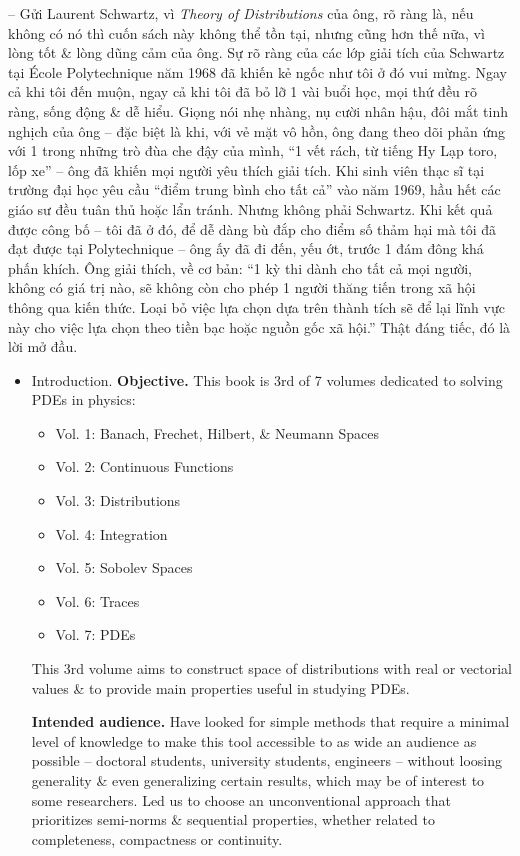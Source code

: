 \documentclass{article}
\begin{document}
\begin{enumerate}
	-- Gửi {\sc Laurent Schwartz}, vì {\it Theory of Distributions} của ông, rõ ràng là, nếu không có nó thì cuốn sách này không thể tồn tại, nhưng cũng hơn thế nữa, vì lòng tốt \& lòng dũng cảm của ông. Sự rõ ràng của các lớp giải tích của {\sc Schwartz} tại \'Ecole Polytechnique năm 1968 đã khiến kẻ ngốc như tôi ở đó vui mừng. Ngay cả khi tôi đến muộn, ngay cả khi tôi đã bỏ lỡ 1 vài buổi học, mọi thứ đều rõ ràng, sống động \& dễ hiểu. Giọng nói nhẹ nhàng, nụ cười nhân hậu, đôi mắt tinh nghịch của ông -- đặc biệt là khi, với vẻ mặt vô hồn, ông đang theo dõi phản ứng với 1 trong những trò đùa che đậy của mình, ``1 vết rách, từ tiếng Hy Lạp toro, lốp xe'' -- ông đã khiến mọi người yêu thích giải tích. Khi sinh viên thạc sĩ tại trường đại học yêu cầu ``điểm trung bình cho tất cả'' vào năm 1969, hầu hết các giáo sư đều tuân thủ hoặc lẩn tránh. Nhưng không phải {\sc Schwartz}. Khi kết quả được công bố -- tôi đã ở đó, để dễ dàng bù đắp cho điểm số thảm hại mà tôi đã đạt được tại Polytechnique -- ông ấy đã đi đến, yếu ớt, trước 1 đám đông khá phấn khích. Ông giải thích, về cơ bản: ``1 kỳ thi dành cho tất cả mọi người, không có giá trị nào, sẽ không còn cho phép 1 người thăng tiến trong xã hội thông qua kiến thức. Loại bỏ việc lựa chọn dựa trên thành tích sẽ để lại lĩnh vực này cho việc lựa chọn theo tiền bạc hoặc nguồn gốc xã hội.'' Thật đáng tiếc, đó là lời mở đầu.
	\begin{itemize}
		\item {\sf Introduction.} {\bf Objective.} This book is 3rd of 7 volumes dedicated to solving PDEs in physics:
		\begin{itemize}
			\item Vol. 1: Banach, Frechet, Hilbert, \& Neumann Spaces
			\item Vol. 2: Continuous Functions
			\item Vol. 3: Distributions
			\item Vol. 4: Integration
			\item Vol. 5: Sobolev Spaces
			\item Vol. 6: Traces
			\item Vol. 7: PDEs
		\end{itemize}
		This 3rd volume aims to construct space of distributions with real or vectorial values \& to provide main properties useful in studying PDEs.
		
		{\bf Intended audience.} Have looked for simple methods that require a minimal level of knowledge to make this tool accessible to as wide an audience as possible -- doctoral students, university students, engineers -- without loosing generality \& even generalizing certain results, which may be of interest to some researchers. Led us to choose an unconventional approach that prioritizes semi-norms \& sequential properties, whether related to completeness, compactness or continuity.
		

\end{itemize}
\end{enumerate}
\end{document}
